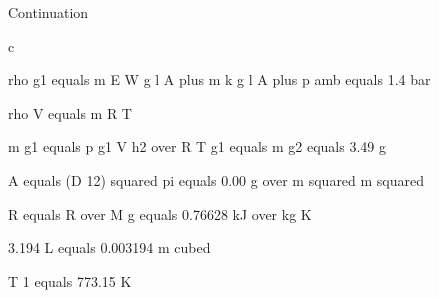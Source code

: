 Continuation

c

rho g1 equals m E W g l A plus m k g l A plus p amb equals 1.4 bar

rho V equals m R T

m g1 equals p g1 V h2 over R T g1 equals m g2 equals 3.49 g

A equals (D 12) squared pi equals 0.00 g over m squared m squared

R equals R over M g equals 0.76628 kJ over kg K

3.194 L equals 0.003194 m cubed

T 1 equals 773.15 K